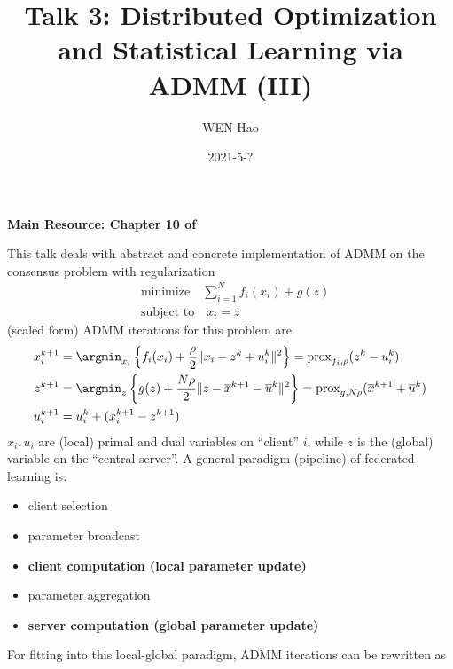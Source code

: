 



\title{Talk 3: Distributed Optimization and Statistical Learning via ADMM (III)}
\date{2021-5-?}
\author{WEN Hao}

\maketitle

{\bfseries Main Resource: Chapter 10 of \cite{boyd2011distributed}}

This talk deals with abstract and concrete implementation of ADMM on the consensus problem with regularization
\begin{align*}
    & \text{minimize} \quad \sum\limits_{i=1}^N f_i(x_i) + g(z) \\
    & \text{subject to} \quad x_i = z
\end{align*}
(scaled form) ADMM iterations for this problem are
\begin{align*}
    x_i^{k+1} & = \argmin_{x_i} \left\{ f_i(x_i) + \dfrac{\rho}{2} \lVert x_i - z^k + u_i^k \rVert^2 \right\} = \operatorname{prox}_{f_i,\rho}(z^k - u_i^k) \\
    z^{k+1} & = \argmin_z \left\{ g(z) + \dfrac{N\rho}{2} \lVert z - \overline{x}^{k+1} - \overline{u}^k \rVert^2 \right\} = \operatorname{prox}_{g,N\rho}(\overline{x}^{k+1} + \overline{u}^k) \\
    u_i^{k+1} & = u_i^k + (x_i^{k+1} - z^{k+1})
\end{align*}
$x_i, u_i$ are (local) primal and dual variables on ``client'' $i$, while $z$ is the (global) variable on the ``central server''. A general paradigm (pipeline) of federated learning is:
\begin{itemize}
    \item client selection
    \item parameter broadcast
    \item {\bfseries client computation (local parameter update)}
    \item parameter aggregation
    \item {\bfseries server computation (global parameter update)}
\end{itemize}
For fitting into this local-global paradigm, ADMM iterations can be rewritten as
